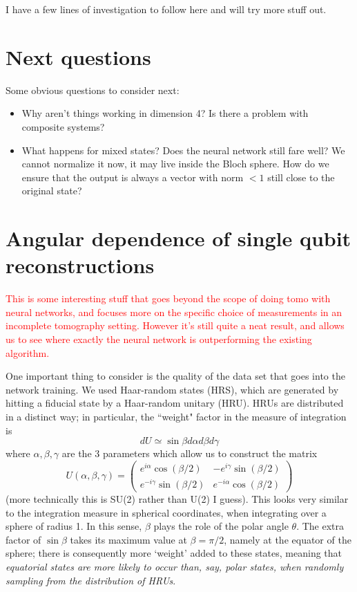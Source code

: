 \documentclass[a4paper,10pt]{article}
\begin{document}
I have a few lines of investigation to follow here and will try more stuff out.

\section{Next questions}
 Some obvious questions to consider next:
 \begin{itemize} 
  \item Why aren't things working in dimension 4? Is there a problem with composite systems?
  \item What happens for mixed states? Does the neural network still fare well? We cannot normalize it now, it may live inside the Bloch sphere. How do we ensure that the output is always a vector with norm $< 1$ still close to the original state?
 \end{itemize}
 
 
\section{Angular dependence of single qubit reconstructions} \label{sec:angdep}

\textcolor{red}{This is some interesting stuff that goes beyond the scope of doing tomo with neural networks, and focuses more on the specific choice of measurements in an incomplete tomography setting. However it's still quite a neat result, and allows us to see where exactly the neural network is outperforming the existing algorithm.}

One important thing to consider is the quality of the data set that goes into the network training. We used Haar-random states (HRS), which are generated by hitting a fiducial state by a Haar-random unitary (HRU). HRUs are distributed in a distinct way; in particular, the ``weight" factor in the measure of integration is 
\begin{equation} 
 dU \simeq \sin \beta d\alpha d\beta d\gamma
\end{equation}
where $\alpha, \beta, \gamma$ are the 3 parameters which allow us to construct the matrix
\begin{equation}
 U(\alpha, \beta, \gamma) = \left( 
  \begin{array}{cc}
   e^{i \alpha} \cos( \beta/2) & -e^{i \gamma} \sin(\beta / 2) \\
    e^{-i \gamma} \sin(\beta / 2) & e^{-i \alpha} \cos( \beta/2) 
  \end{array}
  \right)
\end{equation}
 (more technically this is SU(2) rather than U(2) I guess). This looks very similar to the integration measure in spherical coordinates, when integrating over a sphere of radius 1. In this sense, $\beta$ plays the role of the polar angle $\theta$. The extra factor of $\sin \beta$ takes its maximum value at $\beta = \pi / 2$, namely at the equator of the sphere; there is consequently more `weight' added to these states, meaning that \emph{equatorial states are more likely to occur than, say, polar states, when randomly sampling from the distribution of HRUs}.
 
\end{document}
